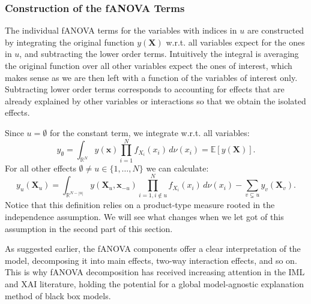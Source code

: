 \subsubsection{Construction of the fANOVA Terms}
The individual fANOVA terms for the variables with indices in $u$ are constructed by integrating the original function $y(\boldsymbol{X})$ w.r.t. all variables expect for the ones in $u$, and subtracting the lower order terms. Intuitively the integral is averaging the original function over all other variables expect the ones of interest, which makes sense as we are then left with a function of the variables of interest only. Subtracting lower order terms corresponds to accounting for effects that are already explained by other variables or interactions so that we obtain the isolated effects.\par
Since $u = \emptyset$ for the constant term, we integrate w.r.t. all variables:
\begin{equation}
    y_{\emptyset} = \int_{\mathbb{R}^N} y(\boldsymbol{x}) \prod_{i=1}^{N} f_{X_i}(x_i) \, d\nu (x_i) = \mathbb{E}[y(\boldsymbol{X})].
    \label{eq:intercept_classical}
\end{equation}
For all other effects $\emptyset \neq u \in \{1, \dots, N\}$ we can calculate:
\begin{equation}
    y_u(\boldsymbol{X}_u) = \int_{\mathbb{R}^{N- |u|}} y(\boldsymbol{X}_u, \boldsymbol{x}_{-u}) \prod_{i=1, i \notin u}^{N} f_{X_i}(x_i) \, d\nu (x_i)- \sum_{v \subsetneq u} y_v(\boldsymbol{X}_v).
    \label{eq:fanova_components_classical}
\end{equation}
Notice that this definition relies on a product-type measure rooted in the independence assumption. We will see what changes when we let got of this assumption in the second part of this section.\par
As suggested earlier, the fANOVA components offer a clear interpretation of the model, decomposing it into main effects, two-way interaction effects, and so on. This is why fANOVA decomposition has received increasing attention in the IML and XAI literature, holding the potential for a global model-agnostic explanation method of black box models.\par
